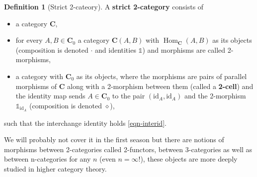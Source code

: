 \documentclass{article}
\theoremstyle{definition}
\newtheorem{defn}[thm]{Definition}
\theoremstyle{remark}
\newcommand{\one}{\mathbb{1}}
\DeclareMathOperator{\Hom}{Hom}
\newcommand{\id}{\text{id}}
\begin{document}
\begin{defn}[Strict 2-cateory]
	A \textbf{strict 2-category} consists of
	\begin{itemize}
		\item a category $\mathbf{C}$,
		\item for every $A,B \in \mathbf{C}_0$ a category $\mathbf{C}(A,B)$ with $\Hom_{\mathbf{C}}(A,B)$ as its objects (composition is denoted $\cdot$ and identities $\one$) and morphisms are called 2-morphisms,
		\item a category with $\mathbf{C}_0$ as its objects, where the morphisms are pairs of parallel morphisms of $\mathbf{C}$ along with a 2-morphism between them (called a \textbf{2-cell}) and the identity map sends $A \in \mathbf{C}_0$ to the pair $(\id_A, \id_A)$ and the 2-morphism $\one_{\id_A}$ (composition is denoted $\diamond$),
	\end{itemize} 
	such that the interchange identity holds \eqref{eqn-interid}.
\end{defn}
We will probably not cover it in the first season but there are notions of morphisms between 2-categories called 2-functors, between 3-categories as well as between n-categories for any $n$ (even $n= \infty$!), these objects are more deeply studied in higher category theory.
\end{document}
